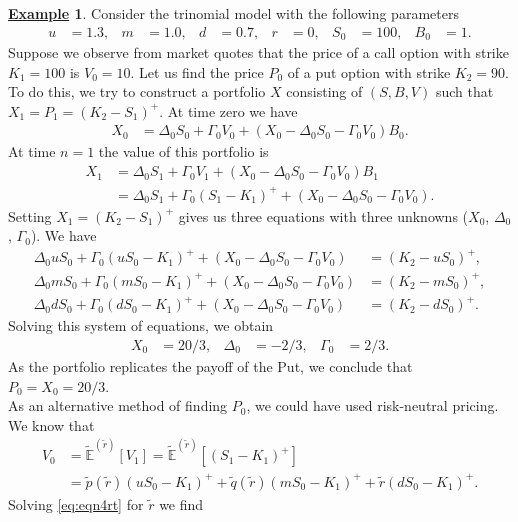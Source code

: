 \documentclass[12pt]{book}
\numberwithin{equation}{chapter}
\theoremstyle{plain}
\numberwithin{theorem}{section}
\theoremstyle{definition}
\newtheorem{example}[theorem]{\underline{Example}}
\numberwithin{exercise}{chapter}
\newcommand{\<}{\langle}
\renewcommand{\>}{\rangle}
\renewcommand{\(}{\left(}
\renewcommand{\)}{\right)}
\renewcommand{\[}{\left[}
\renewcommand{\]}{\right]}
\newcommand\Eb{\mathds{E}}
\newcommand\Gam{\Gamma}
\newcommand\Del{\Delta}
\newcommand\Ebt{\widetilde{\Eb}}
\newcommand\qt{\widetilde{q}}
\newcommand\rt{\widetilde{r}}
\theoremstyle{definition}
\numberwithin{question}{section}
\newcommand\pt{\widetilde{p}}
\begin{document}
\begin{example}
\label{ex:range}
Consider the trinomial model with the following parameters
\begin{align}
u
	&=	1.3 , &
m
	&=	1.0 , &
d
	&=	0.7 , &
r
	&=	0 , &
S_0
	&=	100 , &
B_0
	&=	1 .
\end{align}
Suppose we observe from market quotes that the price of a call option with strike $K_1 = 100$ is $V_0 = 10$.  Let us find the price $P_0$ of a put option with strike $K_2 = 90$.  To do this, we try to construct a portfolio $X$ consisting of $(S,B,V)$ such that $X_1 = P_1 = (K_2 - S_1)^+$.  At time zero we have
\begin{align}
X_0
	&=	\Del_0 S_0 + \Gam_0 V_0 + (X_0 - \Del_0 S_0 - \Gam_0 V_0) B_0 .
\end{align}
At time $n=1$ the value of this portfolio is
\begin{align}
X_1
	&=	\Del_0 S_1 + \Gam_0 V_1 + (X_0 - \Del_0 S_0 - \Gam_0 V_0) B_1 \\
	&=	\Del_0 S_1 + \Gam_0 (S_1 - K_1)^+ + (X_0 - \Del_0 S_0 - \Gam_0 V_0) .
\end{align}
Setting $X_1 = (K_2 - S_1)^+$ gives us three equations with three unknowns ($X_0$, $\Del_0$, $\Gam_0$).  We have
\begin{align}
\Del_0 u S_0 + \Gam_0 (u S_0 - K_1)^+ + (X_0 - \Del_0 S_0 - \Gam_0 V_0)
	&=	(K_2 - u S_0)^+ , \\
\Del_0 m S_0 + \Gam_0 (m S_0 - K_1)^+ + (X_0 - \Del_0 S_0 - \Gam_0 V_0)
	&=	(K_2 - m S_0 )^+ , \\
\Del_0 d S_0 + \Gam_0 (d S_0 - K_1)^+ + (X_0 - \Del_0 S_0 - \Gam_0 V_0)
	&=	(K_2 - d S_0)^+ .
\end{align}
Solving this system of equations, we obtain
\begin{align}
X_0
	&=	20/3 , &
\Del_0
	&=	- 2/3 , &
\Gam_0
	&=	2/3 .
\end{align}
As the portfolio replicates the payoff of the Put, we conclude that $P_0 = X_0 = 20/3$.
\\[0.5em]
As an alternative method of finding $P_0$, we could have used risk-neutral pricing.  We know that
\begin{align}
V_0
	&=	\Ebt^{(\rt)}[ V_1 ] = \Ebt^{(\rt)}[ (S_1 - K_1)^+ ]\\
	&=	\pt(\rt) ( u S_0 - K_1 )^+ + \qt(\rt) ( m S_0 - K_1 )^+ + \rt ( d S_0 - K_1 )^+ .  \label{eq:eqn4rt}
\end{align}
Solving \eqref{eq:eqn4rt} for $\rt$ we find

\end{example}
\end{document}
